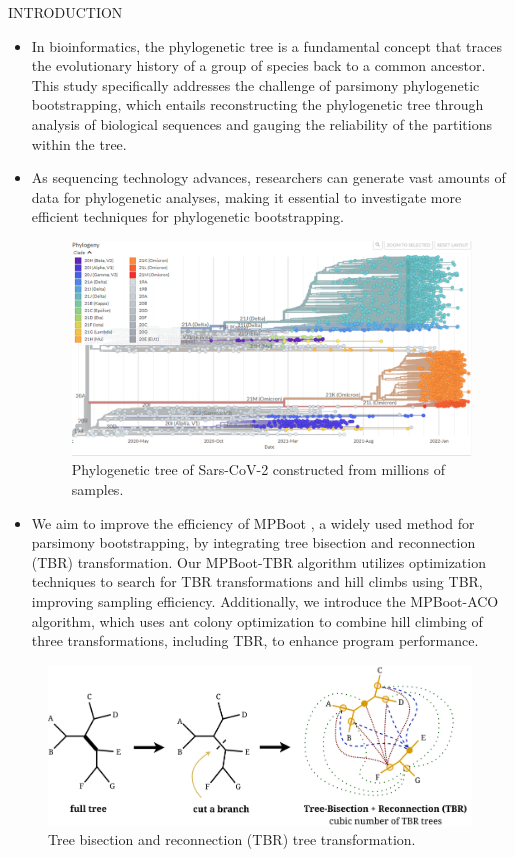\documentclass[%
  final,%
  english,%
]{beamer}
\begin{document}
\begin{frame}[t, fragile = singleslide]
\begin{columns}[t, onlytextwidth]
%
\begin{column}{0.49\textwidth}
\vspace{-0.9cm}
\begin{block}{INTRODUCTION}
\begin{itemize}
\item In bioinformatics, the phylogenetic tree is a fundamental concept that traces the evolutionary history of a group of species back to a common ancestor. This study specifically addresses the challenge of parsimony phylogenetic bootstrapping, which entails reconstructing the phylogenetic tree through analysis of biological sequences and gauging the reliability of the partitions within the tree.
\item As sequencing technology advances, researchers can generate vast amounts of data for phylogenetic analyses, making it essential to investigate more efficient techniques for phylogenetic bootstrapping.
\begin{figure}[!htb]
\label{fig:campuspontagrossa}
\centering%
\includegraphics[width = 0.5\columnwidth]{./Figuras/covid2.png}
\caption{Phylogenetic tree of Sars-CoV-2 constructed from millions of samples.}%
\end{figure}
\item We aim to improve the efficiency of MPBoot \cite{Hoang2018}, a widely used method for parsimony bootstrapping, by integrating tree bisection and reconnection (TBR) transformation. Our MPBoot-TBR algorithm utilizes optimization techniques to search for TBR transformations and hill climbs using TBR, improving sampling efficiency. Additionally, we introduce the MPBoot-ACO algorithm, which uses ant colony optimization to combine hill climbing of three transformations, including TBR, to enhance program performance.
\end{itemize}

\begin{figure}[!htb]
\centering%
\includegraphics[width = 0.92\columnwidth]{./Figuras/TBR.drawio.png}
\caption{Tree bisection and reconnection (TBR) tree transformation.}%
\end{figure}


\end{block}
\end{column}
\end{columns}
\end{frame}
\end{document}
